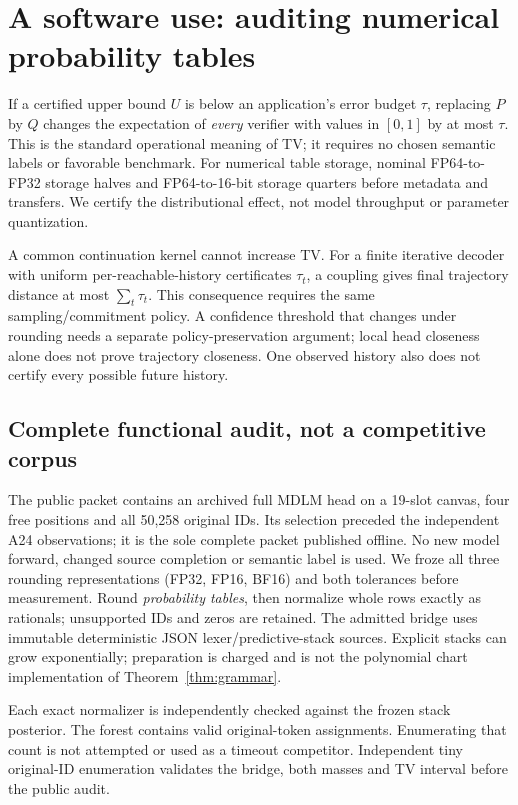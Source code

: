 \documentclass[11pt]{article}
\begin{document}
\section{A software use: auditing numerical probability tables}
If a certified upper bound $U$ is below an application's error budget $\tau$,
replacing $P$ by $Q$ changes the expectation of \emph{every} verifier with
values in $[0,1]$ by at most $\tau$. This is the standard operational meaning
of TV; it requires no chosen semantic labels or favorable benchmark.
For numerical table storage, nominal FP64-to-FP32 storage halves and
FP64-to-16-bit storage quarters before metadata and transfers. We certify
the distributional effect, not model throughput or parameter quantization.

A common continuation kernel cannot increase TV. For a finite iterative
decoder with uniform per-reachable-history certificates $\tau_t$, a coupling
gives final trajectory distance at most $\sum_t\tau_t$. This consequence
requires the same sampling/commitment policy. A confidence threshold that
changes under rounding needs a separate policy-preservation argument; local
head closeness alone does not prove trajectory closeness. One observed
history also does not certify every possible future history.

\subsection{Complete functional audit, not a competitive corpus}
The public packet contains an archived full MDLM head on a 19-slot canvas,
four free positions and all 50,258 original IDs. Its selection preceded the
independent A24 observations; it is the sole complete packet published offline.
No new model forward, changed source completion or semantic label is used.
We froze all three rounding representations (FP32, FP16, BF16) and both
tolerances before measurement. Round \emph{probability tables}, then normalize
whole rows exactly as rationals; unsupported IDs and zeros are retained.
The admitted bridge uses immutable deterministic JSON lexer/predictive-stack
sources. Explicit stacks can grow exponentially; preparation is charged and
is not the polynomial chart implementation of Theorem~\ref{thm:grammar}.

Each exact normalizer is independently checked against the frozen stack
posterior. The forest contains \OriginalWordCount{} valid original-token
assignments. Enumerating that count is not attempted or used as a timeout
competitor. Independent tiny original-ID enumeration validates the bridge,
both masses and TV interval before the public audit.
\end{document}
